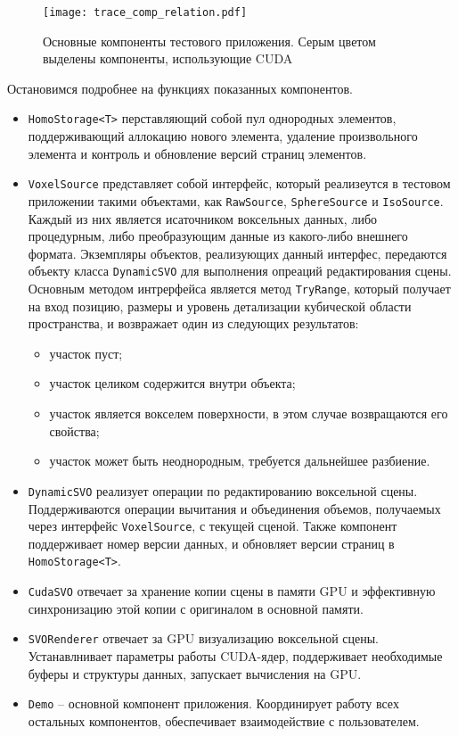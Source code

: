 \documentclass[a4paper,14pt]{extreport}
\begin{document}
\begin{figure}[h]
\center
\texttt{[image: trace\_comp\_relation.pdf]}
\caption{Основные компоненты тестового приложения. Серым цветом выделены компоненты, использующие CUDA}
\label{fig:trace_comp_relation}
\end{figure}

Остановимся подробнее на функциях показанных компонентов.

\begin{itemize}
\item \texttt{HomoStorage<T>} перставляющий собой пул однородных элементов, поддерживающий аллокацию нового элемента, удаление произвольного элемента и контроль и обновление версий страниц элементов.

\item \texttt{VoxelSource} представляет собой интерфейс, который реализеутся в тестовом приложении такими объектами, как \texttt{RawSource}, \texttt{SphereSource} и \texttt{IsoSource}. Каждый из них является исаточником воксельных данных, либо процедурным, либо преобразующим данные из какого-либо внешнего формата. Экземпляры объектов, реализующих данный интерфес, передаются объекту класса \texttt{DynamicSVO} для выполнения опреаций редактирования сцены. Основным методом интрерфейса является метод \texttt{TryRange}, который получает на вход позицию, размеры и уровень детализации кубической области пространства, и возвражает один из следующих результатов:
\begin{itemize}
\item участок пуст;
\item участок целиком содержится внутри объекта;
\item участок является вокселем поверхности, в этом случае возвращаются его свойства;
\item участок может быть неоднородным, требуется дальнейшее разбиение.
\end{itemize}

\item \texttt{DynamicSVO} реализует операции по редактированию воксельной сцены. Поддерживаются операции вычитания и объединения объемов, получаемых через интерфейс \texttt{VoxelSource}, с текущей сценой. Также компонент поддерживает номер версии данных, и обновляет версии страниц в \texttt{HomoStorage<T>}.

\item \texttt{CudaSVO} отвечает за хранение копии сцены в памяти GPU и эффективную синхронизацию этой копии с оригиналом в основной памяти.

\item \texttt{SVORenderer} отвечает за GPU визуализацию воксельной сцены. Устанавлнивает параметры работы CUDA-ядер, поддерживает необходимые буферы и структуры данных, запускает вычисления на GPU.

\item \texttt{Demo} -- основной компонент приложения. Координирует работу всех остальных компонентов, обеспечивает взаимодействие с пользователем.

\end{itemize}
\end{document}
